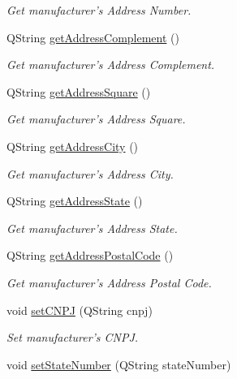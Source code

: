 \begin{DoxyCompactItemize}
\begin{DoxyCompactList}\small\item\em \-Get manufacturer's \-Address \-Number. \end{DoxyCompactList}\item 
\-Q\-String \hyperlink{class_manufacturer_a9c4bff22308fa5dc4c88800bacec2acb}{get\-Address\-Complement} ()
\begin{DoxyCompactList}\small\item\em \-Get manufacturer's \-Address \-Complement. \end{DoxyCompactList}\item 
\-Q\-String \hyperlink{class_manufacturer_a65c0e84079fe234a748e2b9aaf78c7c2}{get\-Address\-Square} ()
\begin{DoxyCompactList}\small\item\em \-Get manufacturer's \-Address \-Square. \end{DoxyCompactList}\item 
\-Q\-String \hyperlink{class_manufacturer_a72603ead820379bfcb2bc7fd6bdb27be}{get\-Address\-City} ()
\begin{DoxyCompactList}\small\item\em \-Get manufacturer's \-Address \-City. \end{DoxyCompactList}\item 
\-Q\-String \hyperlink{class_manufacturer_a98a655fd1a529e5e2be2d8d53472a5a0}{get\-Address\-State} ()
\begin{DoxyCompactList}\small\item\em \-Get manufacturer's \-Address \-State. \end{DoxyCompactList}\item 
\-Q\-String \hyperlink{class_manufacturer_ae546433af9a0857679d985066376b1ae}{get\-Address\-Postal\-Code} ()
\begin{DoxyCompactList}\small\item\em \-Get manufacturer's \-Address \-Postal \-Code. \end{DoxyCompactList}\item 
void \hyperlink{class_manufacturer_a867db6430ed288f4a68bda791a3553ba}{set\-C\-N\-P\-J} (\-Q\-String cnpj)
\begin{DoxyCompactList}\small\item\em \-Set manufacturer's \-C\-N\-P\-J. \end{DoxyCompactList}\item 
void \hyperlink{class_manufacturer_a4e00bb6ea3eb52c3cae2adb9e2613a26}{set\-State\-Number} (\-Q\-String state\-Number)

\end{DoxyCompactItemize}
